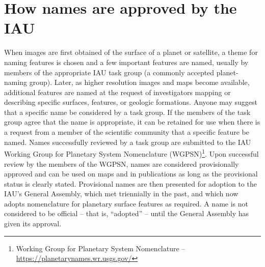 \section{How names are approved by the IAU}
\label{sec:Nomenclature:ApprovingNames}
When images are first obtained of the surface of a planet or satellite, a theme for naming features is chosen 
and a few important features are named, usually by members of the appropriate IAU task group (a commonly 
accepted planet-naming group). Later, as higher resolution images and maps become available, additional 
features are named at the request of investigators mapping or describing specific surfaces, features, 
or geologic formations. Anyone may suggest that a specific name be considered by a task group. 
If the members of the task group agree that the name is appropriate, it can be retained for use 
when there is a request from a member of the scientific community that a specific feature be named. 
Names successfully reviewed by a task group are submitted to the IAU Working Group for Planetary System 
Nomenclature (WGPSN)\footnote{Working Group for Planetary System Nomenclature -- \url{https://planetarynames.wr.usgs.gov/}}. 
Upon successful review by the members of the WGPSN, names are considered provisionally approved and can be 
used on maps and in publications as long as the provisional status is clearly stated. 
Provisional names are then presented for adoption to the IAU's General Assembly, which met triennially in the past, 
and which now adopts nomenclature for planetary surface features as required. A name is not considered to be 
official -- that is, ``adopted'' -- until the General Assembly has given its approval.


